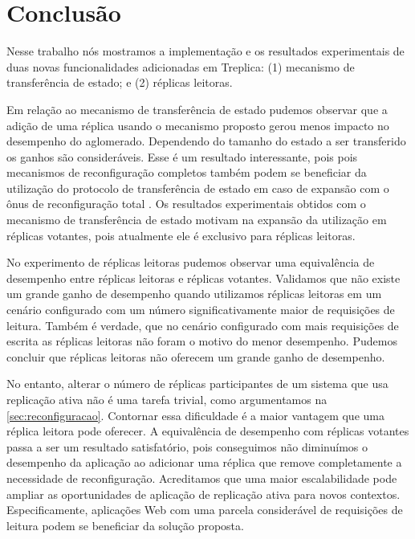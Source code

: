 \chapter*[Conclusão]{Conclusão}\label{sec:conclusao}

Nesse trabalho nós mostramos a implementação e os resultados experimentais de duas novas
funcionalidades adicionadas em Treplica: (1) mecanismo de transferência de estado; e (2)
réplicas leitoras.

Em relação ao mecanismo de transferência de estado pudemos observar que a adição de uma
réplica usando o mecanismo proposto gerou menos impacto no desempenho do aglomerado.
Dependendo do tamanho do estado a ser transferido os ganhos são consideráveis. Esse é um
resultado interessante, pois pois mecanismos de reconfiguração completos também podem se
beneficiar da utilização do protocolo de transferência de estado em caso de expansão com o
ônus de reconfiguração total \cite{lamport10}. Os resultados experimentais obtidos com o
mecanismo de transferência de estado motivam na expansão da utilização em réplicas
votantes, pois atualmente ele é exclusivo para réplicas leitoras.

No experimento de réplicas leitoras pudemos observar uma equivalência de desempenho entre
réplicas leitoras e réplicas votantes. Validamos que não existe um grande ganho de
desempenho quando utilizamos réplicas leitoras em um cenário configurado com um número
significativamente maior de requisições de leitura. Também é verdade, que no cenário
configurado com mais requisições de escrita as réplicas leitoras não foram o motivo do
menor desempenho. Pudemos concluir que réplicas leitoras não oferecem um grande ganho de
desempenho.

No entanto, alterar o número de réplicas participantes de um sistema que usa replicação
ativa não é uma tarefa trivial, como argumentamos na \autoref{sec:reconfiguracao}.
Contornar essa dificuldade é a maior vantagem que uma réplica leitora pode oferecer. A
equivalência de desempenho com réplicas votantes passa a ser um resultado satisfatório,
pois conseguimos não diminuímos o desempenho da aplicação ao adicionar uma réplica que
remove completamente a necessidade de reconfiguração. Acreditamos que uma maior
escalabilidade pode ampliar as oportunidades de aplicação de replicação ativa para novos
contextos. Especificamente, aplicações Web com uma parcela considerável de requisições de
leitura podem se beneficiar da solução proposta.

